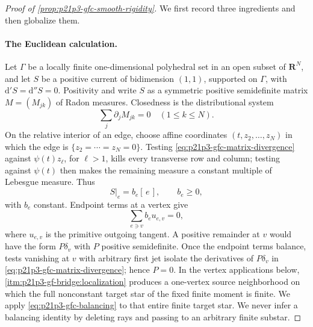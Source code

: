 \begin{proof}[Proof of \cref{prop:p21p3-gfc-smooth-rigidity}]
We first record three ingredients and then globalize them.

\paragraph{The Euclidean calculation.}
Let $\Gamma$ be a locally finite one-dimensional polyhedral set in an
open subset of $\mathbf R^N$, and let $S$ be a positive current of
bidimension $(1,1)$, supported on $\Gamma$, with
$\mathrm d'S=\mathrm d''S=0$.  Positivity and
\cite[Proposition~7.2.9]{CLD25} write $S$ as a symmetric positive
semidefinite matrix $M=(M_{jk})$ of Radon measures.  Closedness is the
distributional system
\begin{equation}
\label{eq:p21p3-gfc-matrix-divergence}
                   \sum_j\partial_jM_{jk}=0
                   \quad(1\leq k\leq N).
\end{equation}
On the relative interior of an edge, choose affine coordinates
$(t,z_2,\ldots,z_N)$ in which the edge is
$\{z_2=\cdots=z_N=0\}$.  Testing
\eqref{eq:p21p3-gfc-matrix-divergence} against
$\psi(t)z_\ell$, for $\ell>1$, kills every transverse row and column;
testing against $\psi(t)$ then makes the remaining measure a constant
multiple of Lebesgue measure.  Thus
\begin{equation}
\label{eq:p21p3-gfc-edge-density}
                     S|_e=b_e[\,e\,],
                     \qquad b_e\geq0,
\end{equation}
with $b_e$ constant.  Endpoint terms at a vertex give
\begin{equation}
\label{eq:p21p3-gfc-balancing}
                       \sum_{e\ni v}b_eu_{e,v}=0,
\end{equation}
where $u_{e,v}$ is the primitive outgoing tangent.  A positive remainder
at $v$ would have the form $P\delta_v$ with $P$ positive
semidefinite.  Once the endpoint terms balance, tests vanishing at $v$
with arbitrary first jet isolate the derivatives of $P\delta_v$ in
\eqref{eq:p21p3-gfc-matrix-divergence}; hence $P=0$.  In the vertex
applications below,
\cref{itm:p21p3-gf-bridge:localization} produces a one-vertex source
neighborhood on which the full nonconstant target star of the fixed finite
moment is finite.  We apply \eqref{eq:p21p3-gfc-balancing} to that entire
finite target star.  We never infer a balancing identity by deleting rays
and passing to an arbitrary finite substar.


\end{proof}
